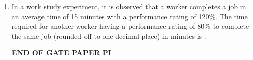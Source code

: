 \documentclass[journal,12pt,onecolumn]{IEEEtran}
\theoremstyle{remark}
\begin{document}
\begin{enumerate}
\vspace{1cm}

\item In a work study experiment, it is observed that a worker completes a job in an average time of 15 minutes with a performance rating of 120\%. The time required for another worker having a performance rating of $80\%$ to complete the same job (rounded off to one decimal place) in minutes is \underline{\hspace{2cm}}.

\vspace{5cm}
\textbf{\Large END OF GATE PAPER PI}











   
\end{enumerate}
\end{document}
